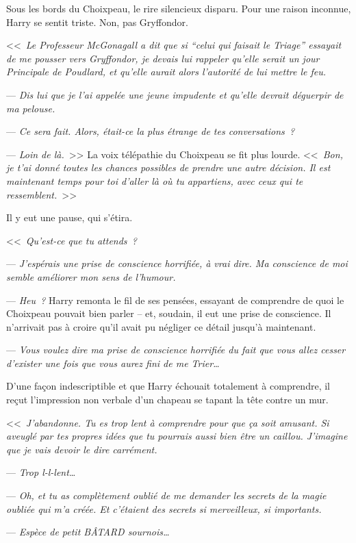 Sous les bords du Choixpeau, le rire silencieux disparu. Pour une raison inconnue, Harry se sentit triste. Non, pas Gryffondor.

<<~\emph{Le Professeur McGonagall a dit que si “celui qui faisait le Triage” essayait de me pousser vers Gryffondor, je devais lui rappeler qu'elle serait un jour Principale de Poudlard, et qu'elle aurait alors l'autorité de lui mettre le feu.}

--- \emph{Dis lui que je l'ai appelée une jeune impudente et qu'elle devrait déguerpir de ma pelouse.}

--- \emph{Ce sera fait. Alors, était-ce la plus étrange de tes conversations~?}

--- \emph{Loin de là.}~>> La voix télépathie du Choixpeau se fit plus lourde. <<~\emph{Bon, je t'ai donné toutes les chances possibles de prendre une autre décision. Il est maintenant temps pour toi d'aller là où tu appartiens, avec ceux qui te ressemblent.}~>>

Il y eut une pause, qui s'étira.

<<~\emph{Qu'est-ce que tu attends~?}

--- \emph{J'espérais une prise de conscience horrifiée, à vrai dire. Ma conscience de moi semble améliorer mon sens de l'humour.}

--- \emph{Heu~?} Harry remonta le fil de ses pensées, essayant de comprendre de quoi le Choixpeau pouvait bien parler -- et, soudain, il eut une prise de conscience. Il n'arrivait pas à croire qu'il avait pu négliger ce détail jusqu'à maintenant.

--- \emph{Vous voulez dire ma prise de conscience horrifiée du fait que vous allez cesser d'exister une fois que vous aurez fini de me Trier…}

D'une façon indescriptible et que Harry échouait totalement à comprendre, il reçut l'impression non verbale d'un chapeau se tapant la tête contre un mur.

<<~\emph{J'abandonne. Tu es trop lent à comprendre pour que ça soit amusant. Si aveuglé par tes propres idées que tu pourrais aussi bien être un caillou. J'imagine que je vais devoir le dire carrément.}

--- \emph{Trop l-l-lent…}

--- \emph{Oh, et tu as complètement oublié de me demander les secrets de la magie oubliée qui m'a créée. Et c'étaient des secrets si merveilleux, si importants.}

--- \emph{Espèce de petit BÂTARD sournois…}

